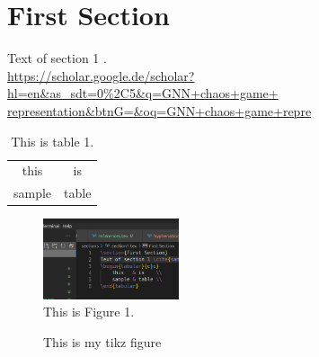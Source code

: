 \section{First Section}

Text of section 1 \cite{sample}.\\
\url{https://scholar.google.de/scholar?hl=en&as_sdt=0\%2C5&q=GNN+chaos+game+
representation&btnG=&oq=GNN+chaos+game+repre}



\begin{table}
    \center
    \begin{tabular}{c|c}
        this   & is    \\
        sample & table \\
    \end{tabular}
    \caption{This is table 1.}
\end{table}

\begin{figure}
    \center
    \includegraphics[width=4cm]{fig/images/figure_01.png}
    \caption{This is Figure 1.}
\end{figure}

\begin{figure}
    \center
    
    \caption{This is my tikz figure}
\end{figure}

\newpage